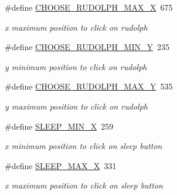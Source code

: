 \begin{DoxyCompactItemize}
\#define \hyperlink{group___project_ga8ae01636e26f0eebff4db085ad886b7f}{C\+H\+O\+O\+S\+E\+\_\+\+R\+U\+D\+O\+L\+P\+H\+\_\+\+M\+A\+X\+\_\+X}~675
\begin{DoxyCompactList}\small\item\em x maximum position to click on rudolph \end{DoxyCompactList}\item 
\mbox{\label{group___project_gaaf4f90d24ae27cc1b050b3e14a9dfd0b}} 
\#define \hyperlink{group___project_gaaf4f90d24ae27cc1b050b3e14a9dfd0b}{C\+H\+O\+O\+S\+E\+\_\+\+R\+U\+D\+O\+L\+P\+H\+\_\+\+M\+I\+N\+\_\+Y}~235
\begin{DoxyCompactList}\small\item\em y minimum position to click on rudolph \end{DoxyCompactList}\item 
\mbox{\label{group___project_ga79ebb51776d8f4e034dd975cc51a6ec9}} 
\#define \hyperlink{group___project_ga79ebb51776d8f4e034dd975cc51a6ec9}{C\+H\+O\+O\+S\+E\+\_\+\+R\+U\+D\+O\+L\+P\+H\+\_\+\+M\+A\+X\+\_\+Y}~535
\begin{DoxyCompactList}\small\item\em y maximum position to click on rudolph \end{DoxyCompactList}\item 
\mbox{\label{group___project_gafbeca65cc187cbc5257d942d56ea0b1b}} 
\#define \hyperlink{group___project_gafbeca65cc187cbc5257d942d56ea0b1b}{S\+L\+E\+E\+P\+\_\+\+M\+I\+N\+\_\+X}~259
\begin{DoxyCompactList}\small\item\em x minimum position to click on sleep button \end{DoxyCompactList}\item 
\mbox{\label{group___project_ga3d49622761c92ecfa6b774c7a42c27ab}} 
\#define \hyperlink{group___project_ga3d49622761c92ecfa6b774c7a42c27ab}{S\+L\+E\+E\+P\+\_\+\+M\+A\+X\+\_\+X}~331
\begin{DoxyCompactList}\small\item\em x maximum position to click on sleep button \end{DoxyCompactList}\item 
\mbox{\label{group___project_gaf327dc5b36b345fbdefccdd9211f3d3f}} 

\end{DoxyCompactItemize}
